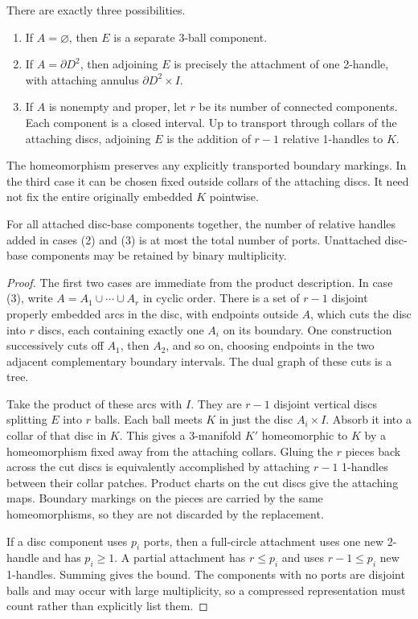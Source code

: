 \begin{theorem}
\label{thm:disc-replacement}
There are exactly three possibilities.
\begin{enumerate}
\item If $A=\varnothing$, then $E$ is a separate 3-ball component.
\item If $A=\partial D^2$, then adjoining $E$ is precisely the attachment
  of one 2-handle, with attaching annulus $\partial D^2\times I$.
\item If $A$ is nonempty and proper, let $r$ be its number of connected
  components.  Each component is a closed interval.  Up to transport
  through collars of the attaching discs, adjoining $E$ is the addition
  of $r-1$ relative 1-handles to $K$.
\end{enumerate}
The homeomorphism preserves any explicitly transported boundary markings.
In the third case it can be chosen fixed outside collars of the attaching
discs.  It need not fix the entire originally embedded $K$ pointwise.

For all attached disc-base components together, the number of relative
handles added in cases (2) and (3) is at most the total number of ports.
Unattached disc-base components may be retained by binary multiplicity.
\end{theorem}
\begin{proof}
The first two cases are immediate from the product description.  In case
(3), write $A=A_1\cup\cdots\cup A_r$ in cyclic order.  There is a set of
$r-1$ disjoint properly embedded arcs in the disc, with endpoints outside
$A$, which cuts the disc into $r$ discs, each containing exactly one
$A_i$ on its boundary.  One construction successively cuts off $A_1$,
then $A_2$, and so on, choosing endpoints in the two adjacent complementary
boundary intervals.  The dual graph of these cuts is a tree.

Take the product of these arcs with $I$.  They are $r-1$ disjoint vertical
discs splitting $E$ into $r$ balls.  Each ball meets $K$ in just the disc
$A_i\times I$.  Absorb it into a collar of that disc in $K$.  This gives
a 3-manifold $K'$ homeomorphic to $K$ by a homeomorphism fixed away from
the attaching collars.  Gluing the $r$ pieces back across the cut discs
is equivalently accomplished by attaching $r-1$ 1-handles between their
collar patches.  Product charts on the cut discs give the attaching maps.
Boundary markings on the pieces are carried by the same homeomorphisms,
so they are not discarded by the replacement.

If a disc component uses $p_i$ ports, then a full-circle attachment uses
one new 2-handle and has $p_i\geq1$.  A partial attachment has
$r\leq p_i$ and uses $r-1\leq p_i$ new 1-handles.  Summing gives the bound.
The components with no ports are disjoint balls and may occur with large
multiplicity, so a compressed representation must count rather than
explicitly list them.
\end{proof}

